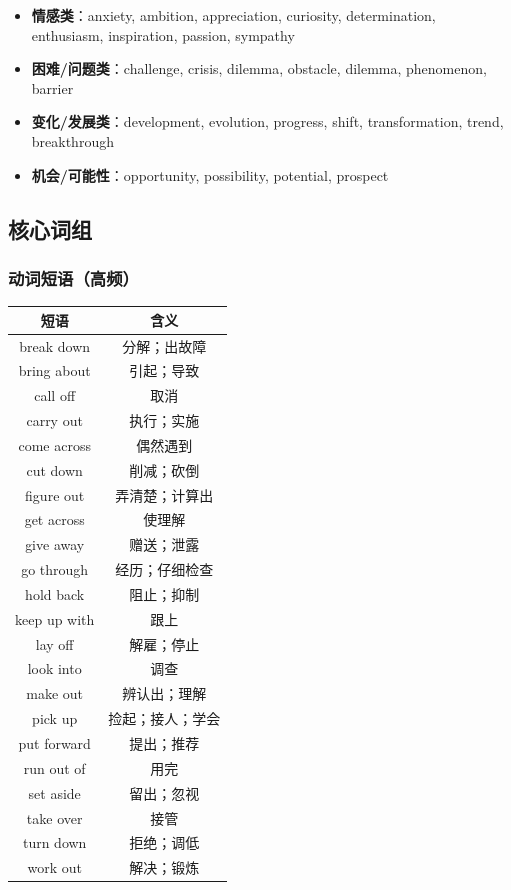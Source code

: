 \begin{itemize}
  \item \textbf{情感类}：anxiety, ambition, appreciation, curiosity, determination, enthusiasm, inspiration, passion, sympathy
  \item \textbf{困难/问题类}：challenge, crisis, dilemma, obstacle, dilemma, phenomenon, barrier
  \item \textbf{变化/发展类}：development, evolution, progress, shift, transformation, trend, breakthrough
  \item \textbf{机会/可能性}：opportunity, possibility, potential, prospect
\end{itemize}

\subsection{核心词组}

\subsubsection{动词短语（高频）}

\begin{center}
\begin{tabular}{c|c}
\textbf{短语} & \textbf{含义} \\ \toprule
break down & 分解；出故障 \\
bring about & 引起；导致 \\
call off & 取消 \\
carry out & 执行；实施 \\
come across & 偶然遇到 \\
cut down & 削减；砍倒 \\
figure out & 弄清楚；计算出 \\
get across & 使理解 \\
give away & 赠送；泄露 \\
go through & 经历；仔细检查 \\
hold back & 阻止；抑制 \\
keep up with & 跟上 \\
lay off & 解雇；停止 \\
look into & 调查 \\
make out & 辨认出；理解 \\
pick up & 捡起；接人；学会 \\
put forward & 提出；推荐 \\
run out of & 用完 \\
set aside & 留出；忽视 \\
take over & 接管 \\
turn down & 拒绝；调低 \\
work out & 解决；锻炼 \\
\bottomrule
\end{tabular}
\end{center}

